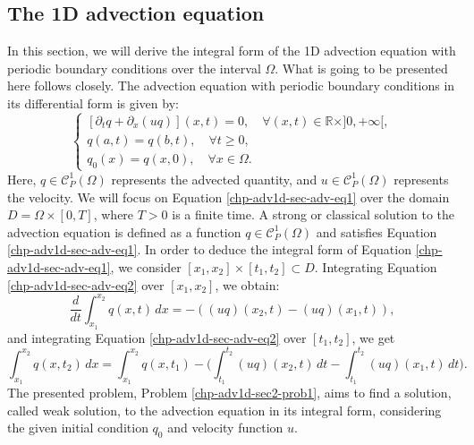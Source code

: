 \subsection{The 1D advection equation}
In this section, we will derive the integral form of the 1D advection equation with periodic boundary conditions over the interval $\Omega$.
What is going to be presented here follows \citet{leveque:1990,leveque:2002} closely.
The advection equation with periodic boundary conditions in its differential form is given by:
\begin{equation}
	\label{chp-adv1d-sec-adv-eq1}
	\begin{cases}
		[{\partial_t q} + {\partial_x (uq)}](x, t)
		= 0, \quad \forall (x,t) \in \mathbb{R}\times ]0, +\infty[,\\
		{q}(a, t) = {q}(b, t), \quad \forall t\geq 0,\\
		q_0(x) = q(x,0), \quad \forall x \in \Omega.
	\end{cases}
\end{equation}
Here, $q \in \mathcal{C}_P^1{(\Omega)}$ represents the advected quantity, and $u \in \mathcal{C}_P^1{(\Omega)}$ represents the velocity.
We will focus on Equation \eqref{chp-adv1d-sec-adv-eq1} over the domain $D = \Omega\times[0,T]$, where $T>0$ is a finite time.
A strong or classical solution to the advection equation is defined as a function ${q}\in\mathcal{C}^1_P(\Omega)$ 
and satisfies Equation \eqref{chp-adv1d-sec-adv-eq1}.
In order to deduce the integral form of Equation \eqref{chp-adv1d-sec-adv-eq1}, we consider
$[x_1, x_2]\times[t_1,t_2]\subset D$. 
Integrating Equation \eqref{chp-adv1d-sec-adv-eq2} over $[x_1, x_2]$, we obtain:
\begin{equation}
    \label{chp-adv1d-sec-adv-eq2}
	\frac{d}{dt} \int_{x_1}^{x_2} q(x,t) \,dx =  
	-({(uq)}(x_2,t) - {(uq)}(x_1,t)) ,
\end{equation}
and integrating Equation \eqref{chp-adv1d-sec-adv-eq2} over $[t_1,t_2]$, we get
\begin{equation}
    \label{chp-adv1d-sec-adv-eq3}
    \int_{x_1}^{x_2} q(x,t_2) \,dx=  \int_{x_1}^{x_2} q(x,t_1)
	-\bigg( \int_{t_1}^{t_2} 
	{(uq)}(x_2, t) \,dt - 
	\int_{t_1}^{t_2}{(uq)}(x_1, t) \,dt \bigg).
\end{equation}
The presented problem, Problem \ref{chp-adv1d-sec2-prob1}, aims to find a solution, called weak solution, to the advection equation
in its integral form, considering the given initial condition ${q}_0$ and velocity function $u$.

